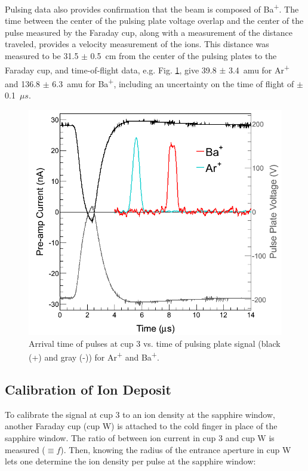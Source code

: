 Pulsing data also provides confirmation that the beam is composed of Ba\textsuperscript{+}.  The time between the center of the pulsing plate voltage overlap and the center of the pulse measured by the Faraday cup, along with a measurement of the distance traveled, provides a velocity measurement of the ions.  This distance was measured to be 31.5 $\pm$ 0.5~cm from the center of the pulsing plates to the Faraday cup, and time-of-flight data, e.g. Fig. \ref{fig:pulses_ArBa}, give 39.8 $\pm$ 3.4~amu for Ar\textsuperscript{+} and 136.8 $\pm$ 6.3~amu for Ba\textsuperscript{+}, including an uncertainty on the time of flight of $\pm$ 0.1~$\mu s$.

\begin{figure}[h]
        \centering
                \includegraphics[width=.7\textwidth]{figures/pulses_BaAr.png}
                \caption{Arrival time of pulses at cup 3 vs. time of pulsing plate signal (black (+) and gray (-)) for Ar\textsuperscript{+} and Ba\textsuperscript{+}.}
\label{fig:pulses_ArBa}
\end{figure}

\subsection{Calibration of Ion Deposit}
\label{subsec:ionDepCal}

To calibrate the signal at cup 3 to an ion density at the sapphire window, another Faraday cup (cup W) is attached to the cold finger in place of the sapphire window.  The ratio of between ion current in cup 3 and cup W is measured ($\equiv f$).  Then, knowing the radius of the entrance aperture in cup W lets one determine the ion density per pulse at the sapphire window:

